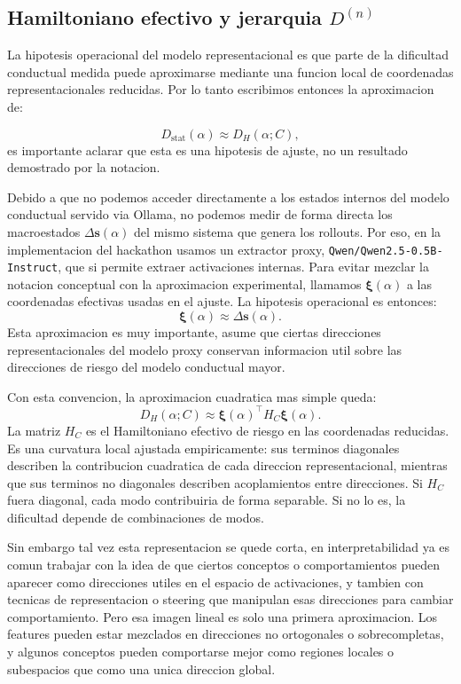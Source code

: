 ﻿\documentclass[10pt,twocolumn]{article}
\newcommand{\Dstat}{D_{\mathrm{stat}}}
\newcommand{\Dham}{D_{H}}
\newcommand{\cond}{C}
\newcommand{\xrep}{\bm{\xi}}
\newcommand{\deltas}{\Delta\bm{s}}
\begin{document}
\subsection{Hamiltoniano efectivo y jerarquia \texorpdfstring{\(D^{(n)}\)}{D(n)}}

La hipotesis operacional del modelo representacional es que parte de la dificultad conductual medida puede aproximarse mediante una funcion local de coordenadas representacionales reducidas. Por lo tanto escribimos entonces la aproximacion de:

\[
\Dstat(\alpha)
\approx
\Dham(\alpha;\cond),
\]
es importante aclarar que esta es una hipotesis de ajuste, no un resultado demostrado por la notacion. 

Debido a que no podemos acceder directamente a los estados internos del modelo conductual servido via Ollama, no podemos medir de forma directa los macroestados \(\deltas(\alpha)\) del mismo sistema que genera los rollouts. Por eso, en la implementacion del hackathon usamos un extractor proxy, \texttt{Qwen/Qwen2.5-0.5B-Instruct}, que si permite extraer activaciones internas. Para evitar mezclar la notacion conceptual con la aproximacion experimental, llamamos \(\xrep(\alpha)\) a las coordenadas efectivas usadas en el ajuste. La hipotesis operacional es entonces:
\[
\xrep(\alpha)\approx\deltas(\alpha).
\]
Esta aproximacion es muy importante, asume que ciertas direcciones representacionales del modelo proxy conservan informacion util sobre las direcciones de riesgo del modelo conductual mayor.

Con esta convencion, la aproximacion cuadratica mas simple queda:
\[
\Dham(\alpha;\cond)
\approx
\xrep(\alpha)^{\top}
H_{\cond}
\xrep(\alpha).
\]
La matriz \(H_{\cond}\) es el Hamiltoniano efectivo de riesgo en las coordenadas reducidas. Es una curvatura local ajustada empiricamente: sus terminos diagonales describen la contribucion cuadratica de cada direccion representacional, mientras que sus terminos no diagonales describen acoplamientos entre direcciones. Si \(H_{\cond}\) fuera diagonal, cada modo contribuiria de forma separable. Si no lo es, la dificultad depende de combinaciones de modos.

Sin embargo tal vez esta representacion se quede corta, en interpretabilidad ya es comun trabajar con la idea de que ciertos conceptos o comportamientos pueden aparecer como direcciones utiles en el espacio de activaciones, y tambien con tecnicas de representacion o steering que manipulan esas direcciones para cambiar comportamiento. Pero esa imagen lineal es solo una primera aproximacion. Los features pueden estar mezclados en direcciones no ortogonales o sobrecompletas, y algunos conceptos pueden comportarse mejor como regiones locales o subespacios que como una unica direccion global.
\end{document}
